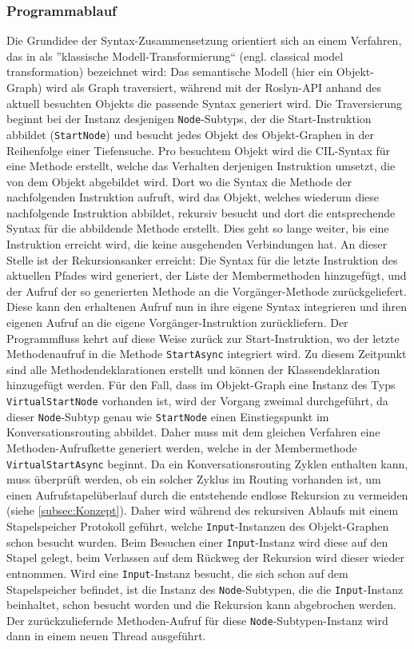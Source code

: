 \subsubsection{Programmablauf}
\label{subsubsec:Programablauf}
Die Grundidee der Syntax-Zusammensetzung orientiert sich an einem Verfahren, das in \cite[S. 272f]{Voelter:13} als ''klassische Modell-Transformierung`` (engl. classical model transformation) bezeichnet wird: Das semantische Modell (hier ein Objekt-Graph) wird als Graph traversiert, während mit der Roslyn-API anhand des aktuell besuchten Objekts die passende Syntax generiert wird. Die Traversierung beginnt bei der Instanz desjenigen \texttt{Node}-Subtyps, der die Start-Instruktion abbildet (\texttt{StartNode}) und besucht jedes Objekt des Objekt-Graphen in der Reihenfolge einer Tiefensuche. Pro besuchtem Objekt wird die CIL-Syntax für eine Methode erstellt, welche das Verhalten derjenigen Instruktion umsetzt, die von dem Objekt abgebildet wird. Dort wo die Syntax die Methode der nachfolgenden Instruktion aufruft, wird das Objekt, welches wiederum diese nachfolgende Instruktion abbildet, rekursiv besucht und dort die entsprechende Syntax für die abbildende Methode erstellt. Dies geht so lange weiter, bis eine Instruktion erreicht wird, die keine ausgehenden Verbindungen hat. An dieser Stelle ist der Rekursionsanker erreicht: Die Syntax für die letzte Instruktion des aktuellen Pfades wird generiert, der Liste der Membermethoden hinzugefügt, und der Aufruf der so generierten Methode an die Vorgänger-Methode zurückgeliefert. Diese kann den erhaltenen Aufruf nun in ihre eigene Syntax integrieren und ihren eigenen Aufruf an die eigene Vorgänger-Instruktion zurückliefern. Der Programmfluss kehrt auf diese Weise zurück zur Start-Instruktion, wo der letzte Methodenaufruf in die Methode \texttt{StartAsync} integriert wird. Zu diesem Zeitpunkt sind alle Methodendeklarationen erstellt und können der Klassendeklaration hinzugefügt werden. Für den Fall, dass im Objekt-Graph eine Instanz des Typs \texttt{VirtualStartNode} vorhanden ist, wird der Vorgang zweimal durchgeführt, da dieser \texttt{Node}-Subtyp genau wie \texttt{StartNode} einen Einstiegspunkt im Konversationsrouting abbildet. Daher muss mit dem gleichen Verfahren eine Methoden-Aufrufkette generiert werden, welche in der Membermethode \texttt{VirtualStartAsync} beginnt.
\newline
Da ein Konversationsrouting Zyklen enthalten kann, muss überprüft werden, ob ein solcher Zyklus im Routing vorhanden ist, um einen Aufrufstapelüberlauf durch die entstehende endlose Rekursion zu vermeiden (siehe \ref{subsec:Konzept}). Daher wird während des rekursiven Ablaufs mit einem Stapelspeicher Protokoll geführt, welche \texttt{Input}-Instanzen des Objekt-Graphen schon besucht wurden. Beim Besuchen einer \texttt{Input}-Instanz wird diese auf den Stapel gelegt, beim Verlassen auf dem Rückweg der Rekursion wird dieser wieder entnommen. Wird eine \texttt{Input}-Instanz besucht, die sich schon auf dem Stapelspeicher befindet, ist die Instanz des \texttt{Node}-Subtypen, die die \texttt{Input}-Instanz beinhaltet, schon besucht worden und die Rekursion kann abgebrochen werden. Der zurückzuliefernde Methoden-Aufruf für diese \texttt{Node}-Subtypen-Instanz wird dann in einem neuen Thread ausgeführt. 
